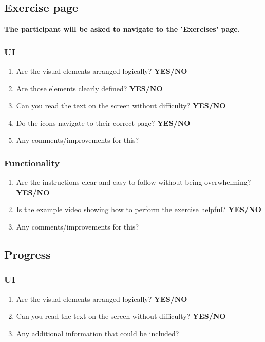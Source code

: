 \documentclass{article}
\begin{document}

\subsection{Exercise page}
\textbf{The participant will be asked to navigate to the 'Exercises' page.}
\subsubsection{UI}
\begin{enumerate}
    \item Are the visual elements arranged logically? \textbf{YES/NO}
    \item Are those elements clearly defined? \textbf{YES/NO}
    \item Can you read the text on the screen without difficulty? \textbf{YES/NO}
    \item Do the icons navigate to their correct page? \textbf{YES/NO}
    \item Any comments/improvements for this?
\end{enumerate}

\subsubsection{Functionality}
\begin{enumerate}
    \item Are the instructions clear and easy to follow without being overwhelming? \textbf{YES/NO}
    \item Is the example video showing how to perform the exercise helpful? \textbf{YES/NO}
    \item Any comments/improvements for this?
\end{enumerate}
\subsection{Progress} %
\subsubsection{UI}
\begin{enumerate}
    \item Are the visual elements arranged logically? \textbf{YES/NO}
    \item Can you read the text on the screen without difficulty? \textbf{YES/NO}
    \item Any additional information that could be included?
\end{enumerate}
\end{document}
